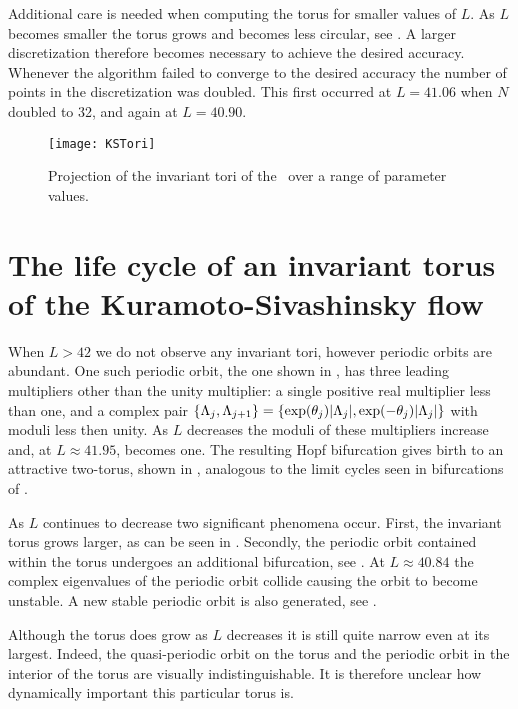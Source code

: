 \documentclass[aip,cha,reprint,
secnumarabic,
nofootinbib, tightenlines,
nobibnotes, showkeys, showpacs,
groupedaddress
]{revtex4-1}
\begin{document}
Additional care is needed when computing the torus for smaller values of $L$.  As $L$ becomes smaller the torus grows and becomes less circular, see .  A larger discretization therefore becomes necessary to achieve the desired accuracy.  Whenever the algorithm failed to converge to the desired accuracy the number of points in the discretization was doubled.  This first occurred at $L=41.06$ when $N$ doubled to 32, and again at $L=40.90$.

 \begin{figure}[!h]
\centering
\texttt{[image: KSTori]}
  \caption{
 Projection of the invariant tori of the \KSe\ over a range of parameter values.}
  \label{fig:Tori}
 \end{figure}

\section{The life cycle of an invariant torus of the Kuramoto-Sivashinsky flow}
\label{s:Life}

When $L>42$ we do not observe any invariant tori, however periodic orbits
are abundant.  One such periodic orbit, the one shown in
, has three leading multipliers other than the unity
multiplier: a single positive real multiplier less than one, and a complex pair
$\{\Lambda_{j},\Lambda_{j+1}\} =
\{\exp(\theta_j)|\Lambda_{j}|,\exp(-\theta_j)|\Lambda_{j}|\}$ with
moduli less then unity.  As $L$ decreases the moduli of these multipliers increase and,
 at $L \approx 41.95$, becomes one.  The resulting Hopf
bifurcation gives birth to an attractive two-torus, shown in
, analogous to the limit cycles seen in bifurcations of
\eqva.

As $L$ continues to decrease two significant phenomena occur.  First, the
invariant torus grows larger, as can be seen in .
Secondly, the periodic orbit contained within the torus undergoes an
additional bifurcation, see .  At $L \approx 40.84$ the
complex eigenvalues of the periodic orbit collide causing the orbit to
become unstable.  A new stable periodic orbit is also generated, see
.

Although the torus does grow as $L$ decreases it is still quite narrow even at its
largest.  Indeed, the quasi-periodic orbit on the torus and the periodic
orbit in the interior of the torus are visually indistinguishable.  It is
therefore unclear how dynamically important this particular torus is.
\end{document}
